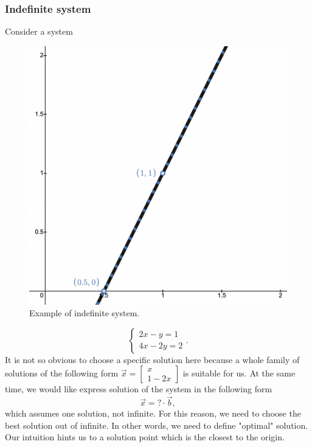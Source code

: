 \subsubsection*{Indefinite system}
    \Ex Consider a system~~~~~~~~~~~~~~~~~~~~~~~~~~~~~~~~~~~~~~~
    \begin{figure}
        \includegraphics[height=0.4\columnwidth, width=0.4\columnwidth]{lectures/images/indefinite_system.png}
        \caption*{\scriptsize{Example of indefinite system.}}
    \end{figure}
    \[
        \left\{
            \begin{array}{l}
                2x-y=1\\
                4x-2y=2
            \end{array}.
        \right.  
    \]
    It is not so obvious to choose a specific solution here because a whole family of solutions of the following form 
    $\vec{x} = 
    \begin{bmatrix}
        x\\1-2x
    \end{bmatrix}$ is suitable for us. At the same time, we would like express solution of the system in the following form
    \[
        \vec{x} = ?\cdot \vec{b},
    \]
    which assumes one solution, not infinite. For this reason, we need to choose the best solution out of infinite. In other words, we need to define "optimal" solution. Our intuition hints us to a solution point which is the closest to the origin. \\\\\\\\
    

